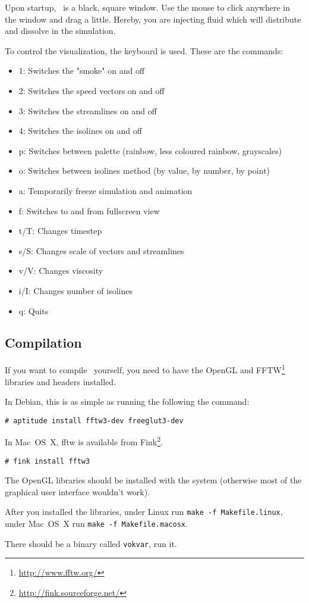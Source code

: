 
Upon startup, \fluids\ is a black, square window. Use the mouse to click
anywhere in the window and drag a little. Hereby, you are injecting fluid which
will distribute and dissolve in the simulation.

To control the visualization, the keyboard is used. These are the commands:

\begin{itemize}
  \item{1:} Switches the "smoke" on and off
  \item{2:} Switches the speed vectors on and off
  \item{3:} Switches the streamlines on and off
  \item{4:} Switches the isolines on and off
  \item{p:} Switches between palette (rainbow, less coloured rainbow, grayscales)
  \item{o:} Switches between isolines method (by value, by number, by point)
  \item{a:} Temporarily freeze simulation and animation
  \item{f:} Switches to and from fullscreen view
  \item{t/T:} Changes timestep
  \item{s/S:} Changes scale of vectors and streamlines
  \item{v/V:} Changes viscosity
  \item{i/I:} Changes number of isolines
  \item{q:} Quits \fluids\
\end{itemize}

\subsection{Compilation}

If you want to compile \fluids\ yourself, you need to have the OpenGL and
FFTW\footnote{\url{http://www.fftw.org/}} libraries and headers installed.

In Debian, this is as simple as running the following the command:

\texttt{\# aptitude install fftw3-dev freeglut3-dev}

In Mac~OS~X, fftw is available from Fink\footnote{\url{http://fink.sourceforge.net/}}.

\texttt{\# fink install fftw3}

The OpenGL libraries should be installed with the system (otherwise most of the
graphical user interface wouldn't work).

After you installed the libraries, under Linux run \texttt{make -f
Makefile.linux}, under Mac~OS~X run \texttt{make -f Makefile.macosx}.

There should be a binary called \texttt{vokvar}, run it.


